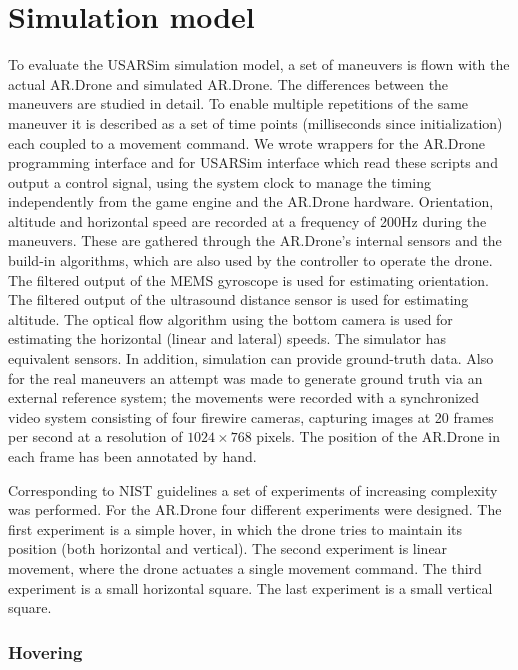 	\section{Simulation model}
To evaluate the USARSim simulation model,  
a set of maneuvers is flown with the actual AR.Drone and
simulated AR.Drone. The differences between the maneuvers are studied in detail. To enable multiple repetitions of the same maneuver it is
described as a set of time points (milliseconds since initialization) each coupled to a movement command.
We wrote wrappers for the AR.Drone programming interface and for USARSim interface which read these scripts and output a control
signal, using the system clock to manage the timing independently from the game engine and the AR.Drone hardware.
Orientation, altitude and horizontal speed are recorded at a frequency of 200Hz during the maneuvers. These are gathered through the AR.Drone's internal sensors and the build-in algorithms, which are
also used by the controller to operate the drone. The filtered output of the MEMS gyroscope is used
for estimating orientation. The filtered output of the ultrasound distance sensor is used for estimating
altitude. The optical 
flow algorithm using the bottom camera is used for estimating the horizontal (linear
and lateral) speeds. The simulator has equivalent sensors. In addition, simulation can provide ground-truth data. 
Also for the real maneuvers an attempt was made to generate ground truth via an external reference system; the movements were recorded with a synchronized video system consisting of four firewire cameras, capturing images at 20 frames per second at a resolution of $1024 \times 768$ pixels. The position of the AR.Drone 
in each frame has been annotated by hand. 

Corresponding to NIST guidelines \cite{Jacoff2010STM}
a set of experiments of increasing complexity was performed. For the AR.Drone
four different experiments were designed.
The first experiment is a simple hover, in which the drone tries to maintain its position (both horizontal and vertical). The second experiment is linear movement, where the drone actuates a single movement command. The third experiment is a small horizontal square. The last experiment is a small vertical square.

\subsubsection{Hovering}

